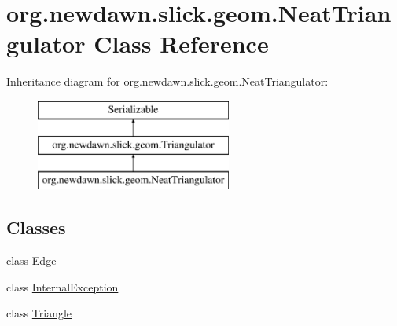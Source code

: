 \hypertarget{classorg_1_1newdawn_1_1slick_1_1geom_1_1_neat_triangulator}{}\section{org.\+newdawn.\+slick.\+geom.\+Neat\+Triangulator Class Reference}
\label{classorg_1_1newdawn_1_1slick_1_1geom_1_1_neat_triangulator}
Inheritance diagram for org.\+newdawn.\+slick.\+geom.\+Neat\+Triangulator\+:\begin{figure}[H]
\begin{center}
\leavevmode
\includegraphics[height=3.000000cm]{classorg_1_1newdawn_1_1slick_1_1geom_1_1_neat_triangulator}
\end{center}
\end{figure}
\subsection*{Classes}
\begin{DoxyCompactItemize}
\item 
class \mbox{\hyperlink{classorg_1_1newdawn_1_1slick_1_1geom_1_1_neat_triangulator_1_1_edge}{Edge}}
\item 
class \mbox{\hyperlink{classorg_1_1newdawn_1_1slick_1_1geom_1_1_neat_triangulator_1_1_internal_exception}{Internal\+Exception}}
\item 
class \mbox{\hyperlink{classorg_1_1newdawn_1_1slick_1_1geom_1_1_neat_triangulator_1_1_triangle}{Triangle}}
\end{DoxyCompactItemize}
